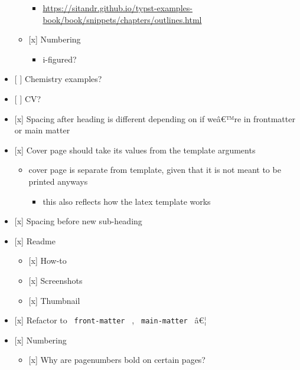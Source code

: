 \begin{itemize}
\begin{itemize}
    \begin{itemize}
    \tightlist
    \item
      \url{https://sitandr.github.io/typst-examples-book/book/snippets/chapters/outlines.html}
    \end{itemize}
  \item
    {[}x{]} Numbering

    \begin{itemize}
    \tightlist
    \item
      i-figured?
    \end{itemize}
  \end{itemize}
\item
  {[} {]} Chemistry examples?
\item
  {[} {]} CV?
\item
  {[}x{]} Spacing after heading is different depending on if weâ€™re in
  frontmatter or main matter
\item
  {[}x{]} Cover page should take its values from the template arguments

  \begin{itemize}
  \tightlist
  \item
    cover page is separate from template, given that it is not meant to
    be printed anyways

    \begin{itemize}
    \tightlist
    \item
      this also reflects how the latex template works
    \end{itemize}
  \end{itemize}
\item
  {[}x{]} Spacing before new sub-heading
\item
  {[}x{]} Readme

  \begin{itemize}
  \tightlist
  \item
    {[}x{]} How-to
  \item
    {[}x{]} Screenshots
  \item
    {[}x{]} Thumbnail
  \end{itemize}
\item
  {[}x{]} Refactor to \texttt{\ front-matter\ } ,
  \texttt{\ main-matter\ } â€¦
\item
  {[}x{]} Numbering

  \begin{itemize}
  \tightlist
  \item
    {[}x{]} Why are pagenumbers bold on certain pages?


\end{itemize}
\end{itemize}
